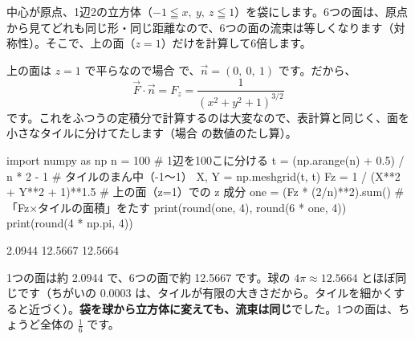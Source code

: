\begin{bkfigure}
\label{bk:8-8:fig-fukuro}
\end{bkfigure}

中心が原点、1辺2の立方体（$-1\leqq x,\ y,\ z\leqq1$）を袋にします。6つの面は、原点から見てどれも同じ形・同じ距離なので、6つの面の流束は等しくなります（対称性）。そこで、上の面（$z=1$）だけを計算して6倍します。

上の面は $z=1$ で平らなので場合  で、$\vec n=(0,\ 0,\ 1)$ です。だから、
\[ \vec F\cdot\vec n=F_z=\frac{1}{(x^2+y^2+1)^{3/2}} \]
です。これをふつうの定積分で計算するのは大変なので、表計算と同じく、面を小さなタイルに分けてたします（場合  の数値のたし算）。

\begin{bkcode}[Python]
import numpy as np
n = 100                                \# 1辺を100こに分ける
t = (np.arange(n) + 0.5) / n * 2 - 1   \# タイルのまん中（-1〜1）
X, Y = np.meshgrid(t, t)
Fz = 1 / (X**2 + Y**2 + 1)**1.5        \# 上の面（z=1）での z 成分
one = (Fz * (2/n)**2).sum()            \# 「Fz×タイルの面積」をたす
print(round(one, 4), round(6 * one, 4))
print(round(4 * np.pi, 4))
\end{bkcode}
\begin{bkcodeout}[実行結果]
2.0944 12.5667
12.5664
\end{bkcodeout}

1つの面は約 2.0944 で、6つの面で約 12.5667 です。球の $4\pi\approx12.5664$ とほぼ同じです（ちがいの 0.0003 は、タイルが有限の大きさだから。タイルを細かくすると近づく）。\textbf{袋を球から立方体に変えても、流束は同じ}でした。1つの面は、ちょうど全体の $\frac16$ です。

